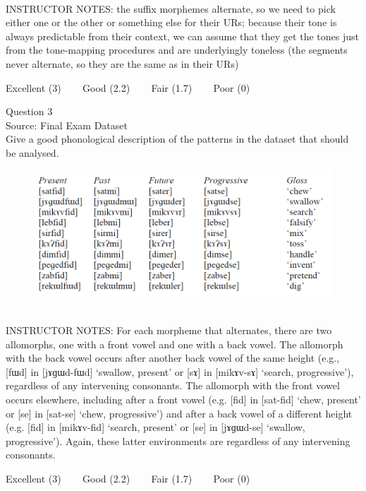 \documentclass[12pt]{article}
\begin{document}
~\\
INSTRUCTOR NOTES: the suffix morphemes alternate, so we need to pick either one or the other or something else for their URs; because their tone is always predictable from their context, we can assume that they get the tones just from the tone-mapping procedures and are underlyingly toneless (the segments never alternate, so they are the same as in their URs)


\vfill
Excellent (3) ~~~ Good (2.2) ~~~ Fair (1.7) ~~~ Poor (0)
\newpage

{\large Question 3}\\

Source: Final Exam Dataset\\

Give a good phonological description of the patterns in the dataset that should be analysed.\\

\begin{figure}[H]
\includegraphics{../images/final_dataset.png}
\end{figure}

~\\
INSTRUCTOR NOTES: For each morpheme that alternates, there are two allomorphs, one with a front vowel and one with a back vowel. The allomorph with the back vowel occurs after another back vowel of the same height (e.g., [fɯd] in [jɤɡɯd-fɯd] ‘swallow, present’ or [sɤ] in [mikɤv-sɤ] ‘search, progressive’), regardless of any intervening consonants. The allomorph with the front vowel occurs elsewhere, including after a front vowel (e.g. [fid] in [sat-fid] ‘chew, present’ or [se] in [sat-se] ‘chew, progressive’) and after a back vowel of a different height (e.g. [fid] in [mikɤv-fid] ‘search, present’ or [se] in [jɤɡɯd-se] ‘swallow, progressive’). Again, these latter environments are regardless of any intervening consonants.


\vfill
Excellent (3) ~~~ Good (2.2) ~~~ Fair (1.7) ~~~ Poor (0)
\newpage
\end{document}
